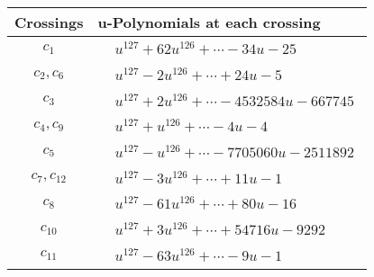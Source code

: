 \documentclass[1p]{elsarticle_modified}
\theoremstyle{definition}
\begin{document}
\begin{tabular}{m{50pt}|m{274pt}}
Crossings & \hspace{64pt}u-Polynomials at each crossing \\
\hline $$\begin{aligned}c_{1}\end{aligned}$$&$\begin{aligned}
&u^{127}+62 u^{126}+\cdots-34 u-25
\end{aligned}$\\
\hline $$\begin{aligned}c_{2},c_{6}\end{aligned}$$&$\begin{aligned}
&u^{127}-2 u^{126}+\cdots+24 u-5
\end{aligned}$\\
\hline $$\begin{aligned}c_{3}\end{aligned}$$&$\begin{aligned}
&u^{127}+2 u^{126}+\cdots-4532584 u-667745
\end{aligned}$\\
\hline $$\begin{aligned}c_{4},c_{9}\end{aligned}$$&$\begin{aligned}
&u^{127}+u^{126}+\cdots-4 u-4
\end{aligned}$\\
\hline $$\begin{aligned}c_{5}\end{aligned}$$&$\begin{aligned}
&u^{127}- u^{126}+\cdots-7705060 u-2511892
\end{aligned}$\\
\hline $$\begin{aligned}c_{7},c_{12}\end{aligned}$$&$\begin{aligned}
&u^{127}-3 u^{126}+\cdots+11 u-1
\end{aligned}$\\
\hline $$\begin{aligned}c_{8}\end{aligned}$$&$\begin{aligned}
&u^{127}-61 u^{126}+\cdots+80 u-16
\end{aligned}$\\
\hline $$\begin{aligned}c_{10}\end{aligned}$$&$\begin{aligned}
&u^{127}+3 u^{126}+\cdots+54716 u-9292
\end{aligned}$\\
\hline $$\begin{aligned}c_{11}\end{aligned}$$&$\begin{aligned}
&u^{127}-63 u^{126}+\cdots-9 u-1
\end{aligned}$\\
\hline
\end{tabular}\\~\\
\end{document}
